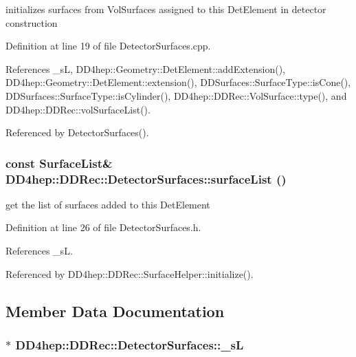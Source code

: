 initializes surfaces from VolSurfaces assigned to this DetElement in detector construction 

Definition at line 19 of file DetectorSurfaces.cpp.

References \_\-sL, DD4hep::Geometry::DetElement::addExtension(), DD4hep::Geometry::DetElement::extension(), DDSurfaces::SurfaceType::isCone(), DDSurfaces::SurfaceType::isCylinder(), DD4hep::DDRec::VolSurface::type(), and DD4hep::DDRec::volSurfaceList().

Referenced by DetectorSurfaces().\hypertarget{class_d_d4hep_1_1_d_d_rec_1_1_detector_surfaces_a61d2f33c2a7e0ade6737de05e7e795f1}{
\subsubsection[{surfaceList}]{\setlength{\rightskip}{0pt plus 5cm}const {\bf SurfaceList}\& DD4hep::DDRec::DetectorSurfaces::surfaceList ()}}
\label{class_d_d4hep_1_1_d_d_rec_1_1_detector_surfaces_a61d2f33c2a7e0ade6737de05e7e795f1}


get the list of surfaces added to this DetElement 

Definition at line 26 of file DetectorSurfaces.h.

References \_\-sL.

Referenced by DD4hep::DDRec::SurfaceHelper::initialize().

\subsection{Member Data Documentation}
\hypertarget{class_d_d4hep_1_1_d_d_rec_1_1_detector_surfaces_ae6635879dddb6bd5dd2624c2e38f46a8}{
\subsubsection[{\_\-sL}]{$\ast$ {\bf DD4hep::DDRec::DetectorSurfaces::\_\-sL}}}
\label{class_d_d4hep_1_1_d_d_rec_1_1_detector_surfaces_ae6635879dddb6bd5dd2624c2e38f46a8}


